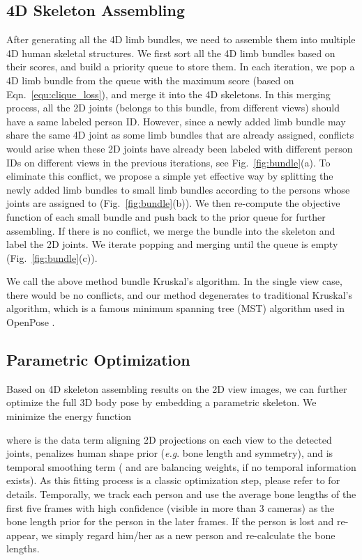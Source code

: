 \documentclass[10pt,twocolumn,letterpaper]{article}
\begin{document}
\subsection{4D Skeleton Assembling}
\label{sec:sec:bundle}

After generating all the 4D limb bundles, we need to assemble them into multiple 4D human skeletal structures. We first sort all the 4D limb bundles based on their scores, and build a priority queue to store them. In each iteration, we pop a 4D limb bundle from the queue with the maximum score (based on Eqn.~\ref{equ:clique_loss}), and merge it into the 4D skeletons. In this merging process, all the 2D joints (belongs to this bundle, from different views) should have a same labeled person ID. However, since a newly added limb bundle may share the same 4D joint as some limb bundles that are already assigned, conflicts would arise when these 2D joints have already been labeled with different person IDs on different views in the previous iterations, see Fig.~\ref{fig:bundle}(a). To eliminate this conflict, we propose a simple yet effective way by splitting the newly added limb bundles to small limb bundles according to the persons whose joints are assigned to (Fig.~\ref{fig:bundle}(b)). We then re-compute the objective function of each small bundle and push back to the prior queue for further assembling. If there is no conflict, we merge the bundle into the skeleton and label the 2D joints. We iterate popping and merging until the queue is empty (Fig.~\ref{fig:bundle}(c)).



We call the above method bundle Kruskal's algorithm. In the single view case, there would be no conflicts, and our method degenerates to traditional Kruskal's algorithm, which is a famous minimum spanning tree (MST) algorithm used in OpenPose \cite{cao2018openpose}.





\subsection{Parametric Optimization}
Based on 4D skeleton assembling results on the 2D view images, we can further optimize the full 3D body pose by embedding a parametric skeleton. We minimize the energy function

where  is the data term aligning 2D projections on each view to the detected joints,  penalizes human shape prior (\textit{e.g}. bone length and symmetry), and  is temporal smoothing term ( and  are balancing weights,  if no temporal information exists). As this fitting process is a classic optimization step, please refer to \cite{bogo2016smplify,zanfir2018monocular,li2018PG} for details. Temporally, we track each person and use the average bone lengths of the first five frames with high confidence (visible in more than 3 cameras) as the bone length prior for the person in the later frames. If the person is lost and re-appear, we simply regard him/her as a new person and re-calculate the bone lengths.
\end{document}
